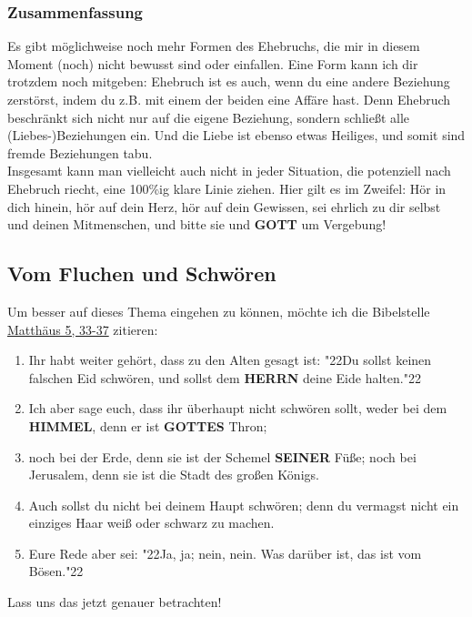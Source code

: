 \documentclass[10pt,a5paper]{article}
\newcommand{\Gottes}[0]{\textbf{GOTTES}}
\newcommand{\Gott}[0]{\textbf{GOTT}}
\newcommand{\Herrn}[0]{\textbf{HERRN}}
\newcommand{\Himmel}[0]{\textbf{HIMMEL}}
\newcommand{\Seiner}[0]{\textbf{SEINER}}
\newcommand{\q}[1]{\char"22{#1}\char"22 }
\begin{document}
	\subsubsection{Zusammenfassung}
		Es gibt m\"oglichweise noch mehr Formen des Ehebruchs,
		die mir in diesem Moment (noch) nicht bewusst sind oder einfallen.
		Eine Form kann ich dir trotzdem noch mitgeben:
		Ehebruch ist es auch,
		wenn du eine andere Beziehung zerst\"orst,
		indem du z.B. mit einem der beiden eine Aff\"are hast.
		Denn Ehebruch beschr\"ankt sich nicht nur auf die eigene Beziehung,
		sondern schlie{\ss}t alle (Liebes-)Beziehungen ein.
		Und die Liebe ist ebenso etwas Heiliges,
		und somit sind fremde Beziehungen tabu.
		\\
		Insgesamt kann man vielleicht auch nicht in jeder Situation,
		die potenziell nach Ehebruch riecht,
		eine 100\%ig klare Linie ziehen.
		Hier gilt es im Zweifel:
		H\"or in dich hinein,
		h\"or auf dein Herz,
		h\"or auf dein Gewissen,
		sei ehrlich zu dir selbst und deinen Mitmenschen,
		und bitte sie und {\Gott} um Vergebung!
					
	\subsection{Vom Fluchen und Schw\"oren}
		Um besser auf dieses Thema eingehen zu k\"onnen,
		m\"ochte ich die Bibelstelle \href{https://www.die-bibel.de/bibeln/online-bibeln/lesen/LU17/MAT.5/Matthäus-5}{Matth\"aus 5, 33-37} zitieren:
		\begin{enumerate}[noitemsep,start=33]
			\item	Ihr habt weiter geh\"ort,
					dass zu den Alten gesagt ist:
					\q{Du sollst keinen falschen Eid schw\"oren,
					und sollst dem {\Herrn} deine Eide halten.}
			\item	Ich aber sage euch,
					dass ihr \"uberhaupt nicht schw\"oren sollt,
					weder bei dem {\Himmel},
					denn er ist {\Gottes} Thron;
			\item	noch bei der Erde,
					denn sie ist der Schemel {\Seiner} F\"u{\ss}e;
					noch bei Jerusalem,
					denn sie ist die Stadt des großen K\"onigs.
			\item	Auch sollst du nicht bei deinem Haupt schw\"oren;
					denn du vermagst nicht ein einziges Haar wei{\ss} oder schwarz zu machen.
			\item	Eure Rede aber sei:
					\q{Ja,
					ja;
					nein,
					nein.
					Was dar\"uber ist,
					das ist vom B\"osen.}
		\end{enumerate}
		Lass uns das jetzt genauer betrachten!
		
\end{document}

